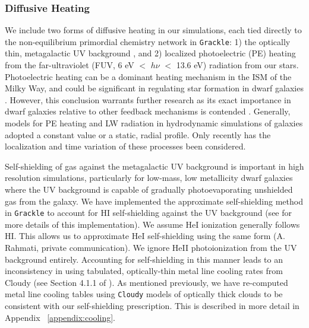 \documentclass[twocolumn]{aastex61}
\begin{document}
\subsubsection{Diffusive Heating}
\label{sec:diffusive heating}
We include two forms of diffusive heating in our simulations, each tied directly to the non-equilibrium primordial chemistry network in \texttt{Grackle}: 1) the optically thin, metagalactic UV background \citet{HM2012}, and 2) localized photoelectric (PE) heating from the far-ultraviolet (FUV, 6 eV $<$ $h\nu$ $<$ 13.6 eV) radiation from our stars. Photoelectric heating can be a dominant heating mechanism in the ISM \citep{Parravano2003} of the Milky Way, and could be significant in regulating star formation in dwarf galaxies \citep{Forbes2016}. However, this conclusion warrants further research as its exact importance in dwarf galaxies relative to other feedback mechanisms is contended \citep{Hu2016,Hu2017}. Generally, models for PE heating and LW radiation in hydrodynamic simulations of galaxies adopted a constant value or a static, radial profile. Only recently has the localization and time variation of these processes been considered.

Self-shielding of gas against the metagalactic UV background is important in high resolution simulations, particularly for low-mass, low metallicity dwarf galaxies where the UV background is capable of gradually photoevaporating unshielded gas from the galaxy. We have implemented the \citet{Rahmati2013} approximate self-shielding method in \texttt{Grackle} to account for HI self-shielding against the UV background (see \citep{GrackleMethod} for more details of this implementation). We assume HeI ionization generally follows HI. This allows us to approximate HeI self-shielding using the same form (A. Rahmati, private communication). We ignore HeII photoionization from the UV background entirely. Accounting for self-shielding in this manner leads to an inconsistency in using tabulated, optically-thin metal line cooling rates from Cloudy (see Section 4.1.1 of \citet{Hu2017}). As mentioned previously, we have re-computed metal line cooling tables using \texttt{Cloudy} models of optically thick clouds to be consistent with our self-shielding prescription. This is described in more detail in Appendix ~\ref{appendix:cooling}. 

\end{document}
